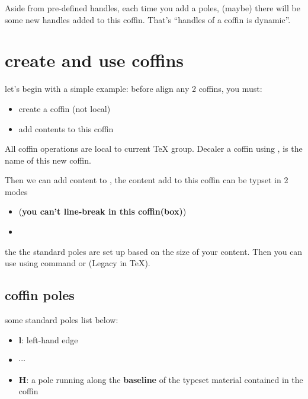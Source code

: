 \documentclass[
    lang=en, 
    class=article,
    classOption={11pt},
    toc={redef}
]{zlatex}
\begin{document}
Aside from pre-defined handles, each time you add a poles, (maybe) there will be some new handles 
added to this coffin. That's ``handles of a coffin is dynamic''.


\section{create and use coffins}
let's begin with a simple example: before align any 2 coffins, you must:
\begin{itemize}
    \item create a coffin (not local)
    \item add contents to this coffin
\end{itemize}

All coffin operations are local to current \TeX{} group. Decaler a coffin using
\cmd{\NewCoffin<\mycoffin>}, \cmd{\mycoffin} is the name of this new coffin.

Then we can add content to \cmd{\mycoffin}, the content add to this coffin can be typset in 
2 modes 
\begin{itemize}
    \item {}(\textbf{you can't line-break in this coffin(box)})
    \item {}
\end{itemize}

the the standard poles are set up based on the size of your content. Then you can use \cmd{\mycoffin}
using command \cmd{\TypesetCoffin\mycoffin} or \cmd{\usebox{\mycoffin}}(Legacy in \TeX{}).

\NewCoffin\mycoffin
\NewCoffin\myvcoffin
\SetHorizontalCoffin{}
\SetVerticalCoffin{}

\pp\usecoffin{\mycoffin}
\pp\usecoffin{\myvcoffin}


\subsection{coffin poles}
some standard poles list below:
\begin{itemize}
    \item \textbf{l}: left-hand edge
    \item $\cdots$
    \item \textbf{H}: a pole running along the \textbf{baseline} of the typeset material contained in the coffin
\end{itemize}
\end{document}

